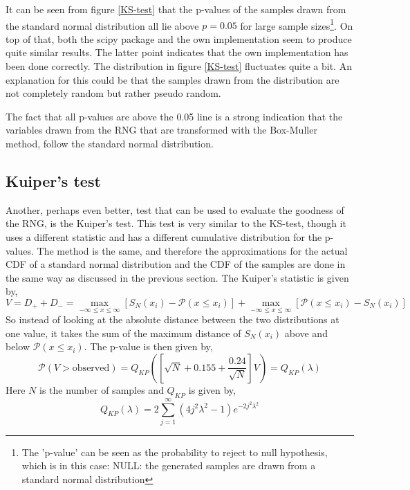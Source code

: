 It can be seen from figure \ref{KS-test} that the p-values of the samples drawn from the standard normal distribution all lie above $p=0.05$ for large sample sizes\footnote{The 'p-value' can be seen as the probability to reject to null hypothesis, which is in this case: NULL: the generated samples are drawn from a standard normal distribution}. On top of that, both the scipy package and the own implementation seem to produce quite similar results. The latter point indicates that the own implementation has been done correctly. The distribution in figure \ref{KS-test} fluctuates quite a bit. An explanation for this could be that the samples drawn from the distribution are not completely random but rather pseudo random. 

The fact that all p-values are above the 0.05 line is a strong indication that the variables drawn from the RNG that are transformed with the Box-Muller method, follow the standard normal distribution.

\subsection{Kuiper's test}

Another, perhaps even better, test that can be used to evaluate the goodness of the RNG, is the Kuiper's test. This test is very similar to the KS-test, though it uses a different statistic and has a different cumulative distribution for the p-values. The method is the same, and therefore the approximations for the actual CDF of a standard normal distribution and the CDF of the samples are done in the same way as discussed in the previous section. 
The Kuiper's statistic is given by,
\begin{equation*}
V = D_{+} + D_{-} =  \underset{-\infty \leq x \leq \infty}{\max} [S_N(x_i) - \mathcal{P}(x \leq x_i)] +  \underset{-\infty \leq x \leq \infty}{\max} [\mathcal{P}(x \leq x_i) - S_N(x_i)]
\end{equation*}
So instead of looking at the absolute distance between the two distributions at one value, it takes the sum of the maximum distance of $S_N(x_i)$ above and below $\mathcal{P}(x \leq x_i)$. The p-value is then given by,
\begin{equation*}
\mathcal{P}(V > \mathrm{observed}) = Q_{KP}([\sqrt{N}+0.155+\frac{0.24}{\sqrt{N}}]V) = Q_{KP}(\lambda)
\end{equation*}
Here $N$ is the number of samples and $Q_{KP}$ is given by,
\begin{equation*}
Q_{KP}(\lambda) = 2\sum_{j=1}^{\infty} (4j^2\lambda^2 -1 )e^{-2j^2\lambda^2}
\end{equation*}


